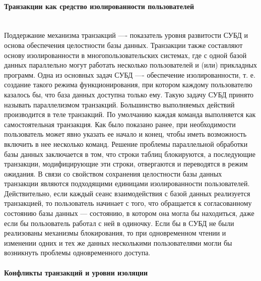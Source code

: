 \paragraph{Транзакции как средство изолированности пользователей} ~\\

Поддержание механизма транзакций —- показатель уровня развитости СУБД
и основа обеспечения целостности базы данных. Транзакции также составляют основу изолированности в многопользовательских системах, где с одной базой данных параллельно могут работать несколько пользователей
и (или) прикладных программ. Одна из основных задач СУБД —- обеспечение изолированности, т. е. создание такого режима функционирования, при
котором каждому пользователю казалось бы, что база данных доступна только ему. Такую задачу СУБД принято называть параллелизмом транзакций.
Большинство выполняемых действий производится в теле транзакций. По
умолчанию каждая команда выполняется как самостоятельная транзакция.
Как было показано ранее, при необходимости пользователь может явно указать ее начало и конец, чтобы иметь возможность включить в нее несколько
команд.
Решение проблемы параллельной обработки базы данных заключается в том,
что строки таблиц блокируются, а последующие транзакции, модифицирующие эти строки, отвергаются и переводятся в режим ожидания. В связи со
свойством сохранения целостности базы данных транзакции являются подходящими единицами изолированности пользователей. Действительно, если каждый сеанс взаимодействия с базой данных реализуется транзакцией, то
пользователь начинает с того, что обращается к согласованному состоянию
базы данных — состоянию, в котором она могла бы находиться, даже если
бы пользователь работал с ней в одиночку.
Если бы в СУБД не были реализованы механизмы блокирования, то при
одновременном чтении и изменении одних и тех же данных несколькими
пользователями могли бы возникнуть проблемы одновременного доступа.


\paragraph{Конфликты транзакций и уровни изоляции} ~\\

